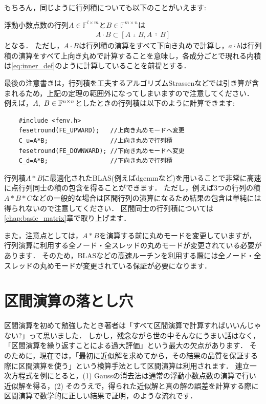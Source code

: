 もちろん，同じように行列積についても以下のことがいえます:
\begin{Thm}[浮動小数点数における行列積の包含] \label{thm:float_matmul}
	浮動小数点数の行列$A \in {\mathbb F}^{l \times m}$と$B \in {\mathbb F}^{m \times n}$は
	\begin{align*}
		A \cdot B \subset [ A ~ \underline{\cdot} ~ B , A ~ \overline{\cdot} ~ B ]
	\end{align*}
	となる．
	ただし，$A \underline{\cdot} B$は行列積の演算をすべて下向き丸めで計算し，$a \overline{\cdot} b$は行列積の演算をすべて上向き丸めで計算することを意味し，各成分ごとで現れる内積は\eqref{eq:inner_def}のように計算していることを前提とする．
\end{Thm}

最後の注意書きは，行列積を工夫するアルゴリズムStrassenなどでは引き算が含まれるため，上記の定理の範囲外になってしまいますので注意してください．
例えば，$A,\ B\in\mathbb{F}^{n\times n}$としたときの行列積は以下のように計算できます:

\begin{verbatim}
	#include <fenv.h>
	fesetround(FE_UPWARD);   //上向き丸めモードへ変更
	C_u=A*B;                 //上向き丸めで行列積
	fesetround(FE_DOWNWARD); //下向き丸めモードへ変更
	C_d=A*B;                 //下向き丸めで行列積
\end{verbatim}

行列積$A*B$に最適化されたBLAS(例えばdgemmなど)を用いることで非常に高速に点行列同士の積の包含を得ることができます．
ただし，例えば3つの行列の積$A*B*C$などの一般的な場合は区間行列の演算になるため結果の包含は単純には得られないので注意してください．
区間同士の行列積については\ref{chap:basic_matrix}章で取り上げます．

また，注意点としては，$A*B$を演算する前に丸めモードを変更していますが，行列演算に利用する全ノード・全スレッドの丸めモードが変更されている必要があります．
そのため，BLASなどの高速ルーチンを利用する際には全ノード・全スレッドの丸めモードが変更されている保証が必要になります．


%
\section{区間演算の落とし穴}
区間演算を初めて勉強したとき著者は「すべて区間演算で計算すればいいんじゃない?」って思いました．
しかし，残念ながら世の中そんなにうまい話はなく，「区間演算を繰り返すことによる過大評価」という最大の欠点があります．
そのために，現在では，「最初に近似解を求めてから，その結果の品質を保証する際に区間演算を使う」という検算手法として区間演算は利用されます．
連立一次方程式を例にとると，(1) Gaussの消去法は通常の浮動小数点数の演算で行い近似解を得る，(2) そのうえで，得られた近似解と真の解の誤差を計算する際に区間演算で数学的に正しい結果で証明，のような流れです．

